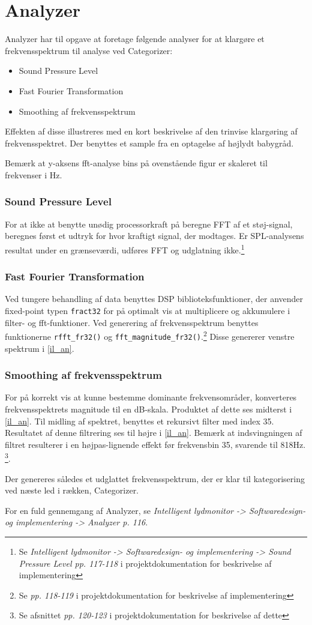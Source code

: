 \section{Analyzer}
Analyzer har til opgave at foretage følgende analyser for at klargøre et frekvensspektrum til analyse ved Categorizer:
\begin{itemize}
	\item Sound Pressure Level
	\item Fast Fourier Transformation
	\item Smoothing af frekvensspektrum
\end{itemize}

Effekten af disse illustreres med en kort beskrivelse af den trinvise klargøring af frekvensspektret. Der benyttes et sample fra en optagelse af højlydt babygråd.

Bemærk at y-aksens fft-analyse bins på ovenstående figur er skaleret til frekvenser i Hz.

\subsubsection*{Sound Pressure Level}
For at ikke at benytte unødig processorkraft på beregne FFT af et støj-signal, beregnes først et udtryk for hvor kraftigt signal, der modtages. Er SPL-analysens resultat under en grænseværdi, udføres FFT og udglatning ikke.\footnote{Se \textit{Intelligent lydmonitor -> Softwaredesign- og implementering -> Sound Pressure Level pp. 117-118} i projektdokumentation for beskrivelse af implementering}

\subsubsection*{Fast Fourier Transformation}
Ved tungere behandling af data benyttes DSP biblioteksfunktioner, der anvender fixed-point typen \verb+fract32+ for på optimalt vis at multiplicere og akkumulere i filter- og fft-funktioner. Ved generering af frekvensspektrum benyttes funktionerne \verb+rfft_fr32()+ og \verb+fft_magnitude_fr32()+.\footnote{Se \textit{pp. 118-119} i projektdokumentation for beskrivelse af implementering} Disse genererer venstre spektrum i \ref{il_an}.

\subsubsection*{Smoothing af frekvensspektrum}
For på korrekt vis at kunne bestemme dominante frekvensområder, konverteres frekvensspektrets magnitude til en dB-skala. Produktet af dette ses midterst i \ref{il_an}.
Til midling af spektret, benyttes et rekursivt filter med index 35. Resultatet af denne filtrering ses til højre i \ref{il_an}. Bemærk at indsvingningen af filtret resulterer i en højpas-lignende effekt før frekvensbin 35, svarende til 818Hz. \footnote{Se afsnittet \textit{pp. 120-123} i projektdokumentation for beskrivelse af dette}. 

Der genereres således et udglattet frekvensspektrum, der er klar til kategorisering ved næste led i rækken, Categorizer.

For en fuld gennemgang af Analyzer, se \textit{Intelligent lydmonitor -> Softwaredesign- og implementering -> Analyzer p. 116}.